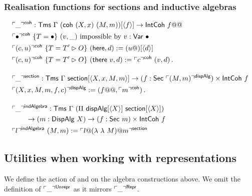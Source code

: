 \subsubsection{Realisation functions for sections and inductive algebras}

\begin{fleqn}
\begin{align*}
&\emb{\_}^{\mta{coh}} : \Tms\ \Gamma \ (\mta{coh}\ (X, x)\ (M, m))[\Msub f] \to \mta{IntCoh}\ f@@ \\
&\emb{\bullet}^{\mta{coh}}\ \{T = \bullet\}\ (v, \_)\text{ impossible by $v : \mta{Var}\ \bullet$} \\
&\emb{(c, u)}^{\mta{coh}}\ \{T = T' \rhd O\}\ (\mta{here}, d) := (u@)[\Msub{d}] \\
&\emb{(c, u)}^{\mta{coh}}\ \{T = T' \rhd O\}\ (\mta{there}\ v, d) := \emb{c}^{\mta{coh}}\ (v, d) \,. \\[1em]
&\emb{\_}^{\mta{section}} : \Tms\ \Gamma \ \mta{section}[\Msub{X, x, M, m}] \to (f : \mta{Sec}\ \emb{(M, m)}^{\mta{dispAlg}}) \times \mta{IntCoh}\ f \\
&\emb{(X, x, M, m, f, c)}^{\mta{dispAlg}} := (f@@, \emb{m}^{\mta{coh}}) \,. \\[1em]
&\emb{\_}^\mta{indAlgebra} : \mta{Tms}\ \Gamma\ (\Pi\ \mta{dispAlg}[\Msub X]\ \mta{section}[\Msub X]) \\ & \qquad \to (m : \mta{DispAlg}\ X) \to (f : \mta{Sec}\ m) \times  \mta{IntCoh}\ f \\
&\emb{l}^\mta{indAlgebra}\ (M, m) := \emb{l@(\lambda\ \lambda\ M)@m}^\mta{section}
\end{align*}
\end{fleqn}

\subsection{Utilities when working with representations} \label{app:reprs}

We define the action of  and  on the algebra constructions above.
We omit the definition of $\ulcorner \_ \urcorner^{\textsf{Unrepr}}$ as it mirrors $\ulcorner \_ \urcorner^{\textsf{Repr}}$.

